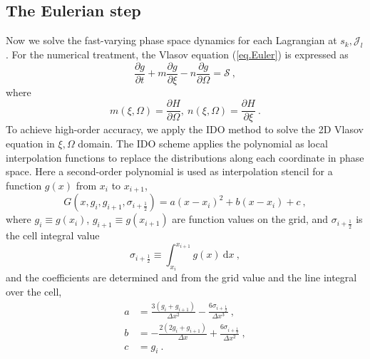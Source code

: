 \subsection{The Eulerian step}
Now we solve the fast-varying phase space dynamics for each Lagrangian at $s_k,\mathcal{J}_l$.
For the numerical treatment, the Vlasov equation (\ref{eq.Euler}) is expressed as
\begin{equation}\label{eq.Euler2}
    \frac{\partial g}{\partial t} + m \frac{\partial  g}{\partial \xi} - n \frac{\partial  g}{\partial \Omega}= \mathcal{S}~,
\end{equation}
where 
\begin{equation}
        m(\xi,\Omega) = \frac{\partial H}{\partial \Omega},~ n(\xi,\Omega) = \frac{\partial H}{\partial \xi}~.
\end{equation}
To achieve high-order accuracy, we apply the IDO method \cite{imadera2009} to solve the 2D Vlasov equation in $\xi,\Omega$ domain.
The IDO scheme applies the polynomial as local interpolation functions to replace the distributions along each coordinate in phase space. 
Here a second-order  polynomial is used as interpolation stencil for a function $g(x)$ from $x_i$ to $x_{i+1}$,
\begin{equation}\label{eq.intg}
    G(x,g_{i},g_{i+1},\sigma_{i+\frac{1}{2}}) = a\left(x-x_i\right)^2+b\left(x-x_i\right)+c~,
\end{equation}
where $g_i \equiv g(x_i)$, $g_{i+1} \equiv g(x_{i+1})$ are function values on the grid, and $\sigma_{i+\frac{1}{2}}$ is the cell integral value 
\begin{equation}
    \sigma_{i+\frac{1}{2}} \equiv \int_{x_i}^{x_{i+1}} g(x)~\mathrm{d}x~,
\end{equation}
and the coefficients are determined and from the grid value and the line integral over the cell,
\begin{equation}
    \begin{aligned}
        a & =\frac{3\left(g_i+g_{i+1}\right)}{\Delta x^2}-\frac{6 \sigma_{i+\frac{1}{2}}}{\Delta x^3}~, \\
        b & =-\frac{2\left(2 g_i+g_{i+1}\right)}{\Delta x}+\frac{6 \sigma_{i+\frac{1}{2}}}{\Delta x^2}~, \\
        c & = g_i~.
    \end{aligned}
\end{equation}

